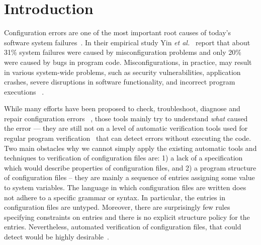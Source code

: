 \section{Introduction}
\label{sec-intro}

Configuration errors are one of the most important root causes of
today's software system failures~\cite{xu15systems, yin11anempirical}.
In their empirical study Yin {\em et al.}~\cite{yin11anempirical} report
that about 31\% system failures were caused by misconfiguration problems and only 20\% were caused by bugs in program code. 
Misconfigurations, in practice, may result in various
system-wide problems, such as security vulnerabilities, 
application crashes, severe disruptions in software
functionality, and incorrect program executions%
~\cite{zhang14encore, yuan11context, xu13do, xu15hey}.  

While many efforts have been proposed 
to check, troubleshoot, diagnose and repair configuration errors%
~\cite{attariyan10automating,
su07autobash, whitaker04configuration},
those tools mainly try to understand {\emph{what}} caused the error ---
they are still not on a level of
automatic verification tools used for regular program 
verification~\cite{Leino10Dafny, PiskacWZ14, BobotFMP15} that can
detect errors without executing the code.
Two main obstacles why we cannot simply apply the existing automatic 
tools and techniques to verification of configuration files are: 1) a lack
of a specification which would describe properties of configuration files, and 2) a program structure of configuration files -- they
are mainly a sequence of entries assigning some value to system variables. The language in which configuration files are written does 
not adhere to a specific grammar or syntax. In particular, the
entries in configuration files are untyped. Moreover, there are surprisingly few rules specifying constraints on entries and there
is no explicit structure policy for the entries.
Nevertheless, automated verification of configuration 
files, that could detect would be highly
desirable~\cite{wang04automatic, zhang14encore, xu15systems}.

